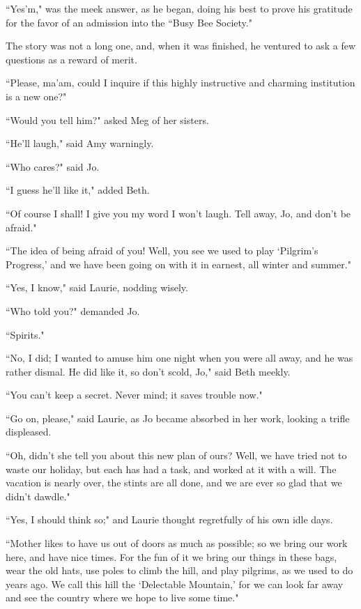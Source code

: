``Yes'm," was the meek answer, as he began, doing his
best to prove his gratitude for the favor of an admission into the ``Busy
Bee Society."

The story was not a long one, and, when it was finished, he ventured to
ask a few questions as a reward of merit.

``Please, ma'am, could I inquire if this highly
instructive and charming institution is a new one?"

``Would you tell him?" asked Meg of her sisters.

``He'll laugh," said Amy warningly.

``Who cares?" said Jo.

``I guess he'll like it," added Beth.

``Of course I shall! I give you my word I won't laugh.
Tell away, Jo, and don't be afraid."

``The idea of being afraid of you! Well, you see we used to play
`Pilgrim's Progress,'
and we have been going on with it in earnest, all winter and summer."

``Yes, I know," said Laurie, nodding wisely.

``Who told you?" demanded Jo.

``Spirits."

``No, I did; I wanted to amuse him one night when you were all away, and
he was rather dismal. He did like it, so don't scold,
Jo," said Beth meekly.

``You can't keep a secret. Never mind; it saves trouble
now."

``Go on, please," said Laurie, as Jo became absorbed in her work, looking
a trifle displeased.

``Oh, didn't she tell you about this new plan of ours?
Well, we have tried not to waste our holiday, but each has had a task,
and worked at it with a will. The vacation is nearly over, the stints
are all done, and we are ever so glad that we didn't
dawdle."

``Yes, I should think so;" and Laurie thought regretfully of his own idle
days.

``Mother likes to have us out of doors as much as possible; so we bring
our work here, and have nice times. For the fun of it we bring our
things in these bags, wear the old hats, use poles to climb the hill,
and play pilgrims, as we used to do years ago. We call this hill the
`Delectable Mountain,' for we can look
far away and see the country where we hope to live some time."

